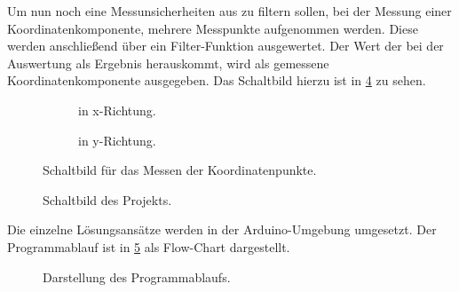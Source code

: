 Um nun noch eine Messunsicherheiten aus zu filtern sollen, bei der Messung einer Koordinatenkomponente, mehrere Messpunkte aufgenommen werden.
Diese werden anschließend über ein Filter-Funktion ausgewertet.
Der Wert der bei der Auswertung als Ergebnis herauskommt, wird als gemessene Koordinatenkomponente ausgegeben.
Das Schaltbild hierzu ist in \cref{fig:schaltbild} zu sehen.

\begin{figure}[ht!]
    \begin{subfigure}{0.49\textwidth}
        \centering
        
        \caption{in x-Richtung.}
        \label{fig:xlesen}
    \end{subfigure}
    \hfill
    \begin{subfigure}{0.49\textwidth}
        \centering
        
        \caption{in y-Richtung.}
        \label{fig:ylesen}
    \end{subfigure}
    \caption{Schaltbild für das Messen der Koordinatenpunkte.}
    \label{fig:xylesen}
\end{figure}
\begin{figure}[ht!]
    \centering
    
    \caption{Schaltbild des Projekts.}
    \label{fig:schaltbild}
\end{figure}
Die einzelne Lösungsansätze werden in der Arduino-Umgebung umgesetzt.
Der Programmablauf ist in \cref{fig:flowchart} als Flow-Chart dargestellt.

\begin{figure}
    \centering
    
    \caption{Darstellung des Programmablaufs.}
    \label{fig:flowchart}
\end{figure}